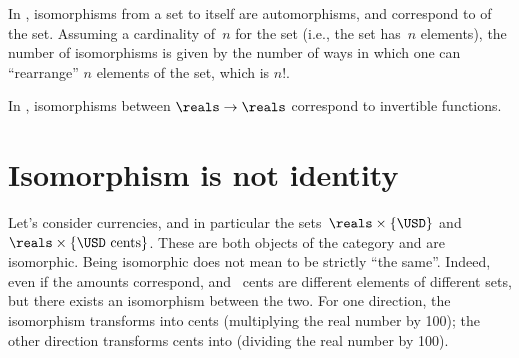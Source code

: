 \begin{example}
In \FinSet, isomorphisms from a set to itself are automorphisms, and correspond to \emph{} of the set. Assuming a cardinality of~$n$ for the set (i.e., the set has~$n$ elements), the number of isomorphisms is given by the number of ways in which one can ``rearrange'' $n$ elements of the set, which is $n!$.
\end{example}

\begin{example}
In \Set, isomorphisms between $\reals\to \reals$ correspond to invertible functions.
\end{example}


\section{Isomorphism is not identity}
\begin{example}
Let's consider currencies, and in particular the sets~$\reals\times \{\USD\}$ and~$\reals\times \{\USD \text{ cents}\}$. These are both objects of the category \Curr and are isomorphic. Being isomorphic does not mean to be strictly ``the same''. Indeed, even if the amounts correspond, \unit[10]{\USD} and \unit[1,000]{\USD cents} are different elements of different sets, but there exists an isomorphism between the two. For one direction, the isomorphism transforms \USD into \USD cents (multiplying the real number by 100); the other direction transforms \USD cents into \USD (dividing the real number by 100).
\end{example}










